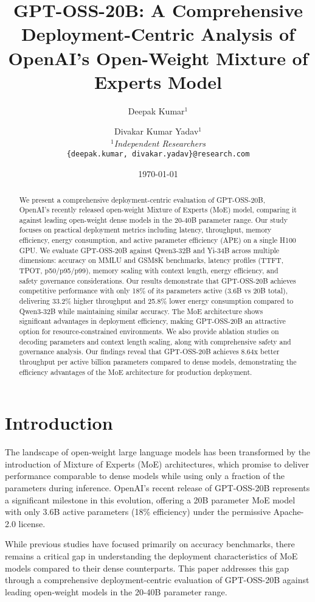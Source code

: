 \documentclass[11pt]{article}
\title{GPT-OSS-20B: A Comprehensive Deployment-Centric Analysis of OpenAI's Open-Weight Mixture of Experts Model}
\author{
    Deepak Kumar$^{1}$ \and Divakar Kumar Yadav$^{1}$ \\
    \textit{$^{1}$Independent Researchers} \\
    \texttt{\{deepak.kumar, divakar.yadav\}@research.com}
}
\date{\today}
\begin{document}
\maketitle

\begin{abstract}
We present a comprehensive deployment-centric evaluation of GPT-OSS-20B, OpenAI's recently released open-weight Mixture of Experts (MoE) model, comparing it against leading open-weight dense models in the 20-40B parameter range. Our study focuses on practical deployment metrics including latency, throughput, memory efficiency, energy consumption, and active parameter efficiency (APE) on a single H100 GPU. We evaluate GPT-OSS-20B against Qwen3-32B and Yi-34B across multiple dimensions: accuracy on MMLU and GSM8K benchmarks, latency profiles (TTFT, TPOT, p50/p95/p99), memory scaling with context length, energy efficiency, and safety governance considerations. Our results demonstrate that GPT-OSS-20B achieves competitive performance with only 18\% of its parameters active (3.6B vs 20B total), delivering 33.2\% higher throughput and 25.8\% lower energy consumption compared to Qwen3-32B while maintaining similar accuracy. The MoE architecture shows significant advantages in deployment efficiency, making GPT-OSS-20B an attractive option for resource-constrained environments. We also provide ablation studies on decoding parameters and context length scaling, along with comprehensive safety and governance analysis. Our findings reveal that GPT-OSS-20B achieves 8.64x better throughput per active billion parameters compared to dense models, demonstrating the efficiency advantages of the MoE architecture for production deployment.
\end{abstract}

\section{Introduction}

The landscape of open-weight large language models has been transformed by the introduction of Mixture of Experts (MoE) architectures, which promise to deliver performance comparable to dense models while using only a fraction of the parameters during inference. OpenAI's recent release of GPT-OSS-20B represents a significant milestone in this evolution, offering a 20B parameter MoE model with only 3.6B active parameters (18\% efficiency) under the permissive Apache-2.0 license.

While previous studies have focused primarily on accuracy benchmarks, there remains a critical gap in understanding the deployment characteristics of MoE models compared to their dense counterparts. This paper addresses this gap through a comprehensive deployment-centric evaluation of GPT-OSS-20B against leading open-weight models in the 20-40B parameter range.
\end{document}
